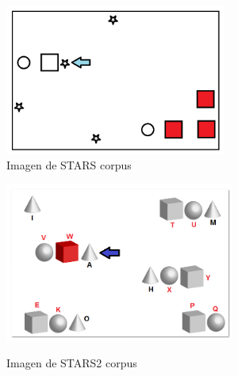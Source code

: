 \begin{figure}
\begin{minipage}[b]{0.5\linewidth}
\centering
\includegraphics[width=\textwidth]{images/STARS.png}\\[0pt]
\caption{Imagen de STARS corpus}
\label{fig-STARS}
\vspace*{.1cm}
\end{minipage}
\hspace*{0cm}
\begin{minipage}[b]{0.5\linewidth}
\centering
\includegraphics[width=\textwidth]{images/STARS2.png}\\[0pt]
\caption{Imagen de STARS2 corpus}
\label{fig-STARS2}
\end{minipage}
\end{figure}

